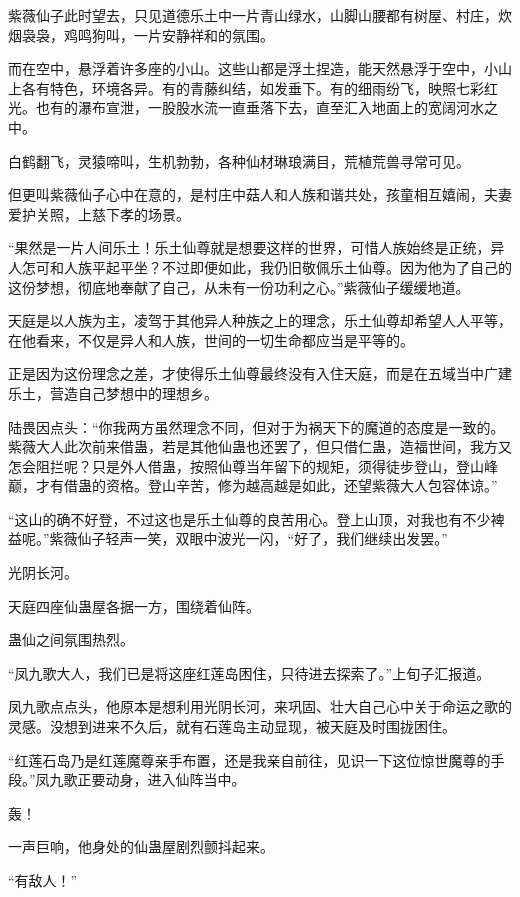 \begin{this_body}
紫薇仙子此时望去，只见道德乐土中一片青山绿水，山脚山腰都有树屋、村庄，炊烟袅袅，鸡鸣狗叫，一片安静祥和的氛围。

而在空中，悬浮着许多座的小山。这些山都是浮土捏造，能天然悬浮于空中，小山上各有特色，环境各异。有的青藤纠结，如发垂下。有的细雨纷飞，映照七彩红光。也有的瀑布宣泄，一股股水流一直垂落下去，直至汇入地面上的宽阔河水之中。

白鹤翻飞，灵猿啼叫，生机勃勃，各种仙材琳琅满目，荒植荒兽寻常可见。

但更叫紫薇仙子心中在意的，是村庄中菇人和人族和谐共处，孩童相互嬉闹，夫妻爱护关照，上慈下孝的场景。

“果然是一片人间乐土！乐土仙尊就是想要这样的世界，可惜人族始终是正统，异人怎可和人族平起平坐？不过即便如此，我仍旧敬佩乐土仙尊。因为他为了自己的这份梦想，彻底地奉献了自己，从未有一份功利之心。”紫薇仙子缓缓地道。

天庭是以人族为主，凌驾于其他异人种族之上的理念，乐土仙尊却希望人人平等，在他看来，不仅是异人和人族，世间的一切生命都应当是平等的。

正是因为这份理念之差，才使得乐土仙尊最终没有入住天庭，而是在五域当中广建乐土，营造自己梦想中的理想乡。

陆畏因点头：“你我两方虽然理念不同，但对于为祸天下的魔道的态度是一致的。紫薇大人此次前来借蛊，若是其他仙蛊也还罢了，但只借仁蛊，造福世间，我方又怎会阻拦呢？只是外人借蛊，按照仙尊当年留下的规矩，须得徒步登山，登山峰巅，才有借蛊的资格。登山辛苦，修为越高越是如此，还望紫薇大人包容体谅。”

“这山的确不好登，不过这也是乐土仙尊的良苦用心。登上山顶，对我也有不少裨益呢。”紫薇仙子轻声一笑，双眼中波光一闪，“好了，我们继续出发罢。”

光阴长河。

天庭四座仙蛊屋各据一方，围绕着仙阵。

蛊仙之间氛围热烈。

“凤九歌大人，我们已是将这座红莲岛困住，只待进去探索了。”上旬子汇报道。

凤九歌点点头，他原本是想利用光阴长河，来巩固、壮大自己心中关于命运之歌的灵感。没想到进来不久后，就有石莲岛主动显现，被天庭及时围拢困住。

“红莲石岛乃是红莲魔尊亲手布置，还是我亲自前往，见识一下这位惊世魔尊的手段。”凤九歌正要动身，进入仙阵当中。

轰！

一声巨响，他身处的仙蛊屋剧烈颤抖起来。

“有敌人！”


\end{this_body}
